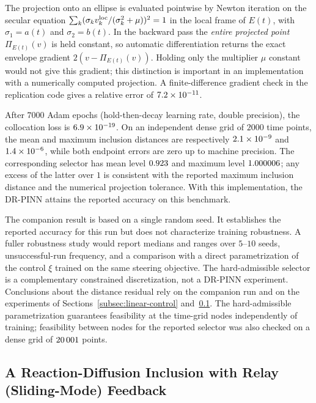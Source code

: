 \documentclass[11pt]{elsarticle}
\theoremstyle{definition}
\theoremstyle{remark}
\numberwithin{equation}{section}
\begin{document}
The projection onto an ellipse is evaluated pointwise by Newton iteration on
the secular equation
$\sum_k(\sigma_k v_k^{\rm loc}/(\sigma_k^2+\mu))^2=1$ in the local frame of
$E(t)$, with $\sigma_1=a(t)$ and $\sigma_2=b(t)$. In the backward pass the
\emph{entire projected point} $\Pi_{E(t)}(v)$ is held constant, so automatic
differentiation returns the exact envelope gradient
$2(v-\Pi_{E(t)}(v))$. Holding only the multiplier $\mu$ constant would not
give this gradient; this distinction is important in an implementation with
a numerically computed projection. A finite-difference gradient check in the
replication code gives a relative error of $7.2\times 10^{-11}$.

After $7000$ Adam epochs (hold-then-decay learning rate, double precision),
the collocation loss is $6.9\times 10^{-19}$. On an independent dense grid of
$2000$ time points, the mean and maximum inclusion distances are respectively
$2.1\times 10^{-9}$ and $1.4\times 10^{-6}$, while both endpoint errors are zero
up to machine precision. The corresponding selector has mean level $0.923$
and maximum level $1.000006$; any excess of the latter over $1$ is
consistent with the reported maximum inclusion distance and the numerical
projection tolerance. With this implementation, the DR-PINN attains the reported accuracy on
this benchmark.

The companion result is based on a single random seed. It establishes the
reported accuracy for this run but does not characterize training
robustness. A fuller robustness study would report medians and ranges over
$5$--$10$ seeds, unsuccessful-run frequency, and a comparison with a direct
parametrization of the control $\xi$ trained on the same steering
objective.
The hard-admissible selector is a complementary constrained discretization,
not a DR-PINN experiment. Conclusions about the distance residual rely on
the companion run and on the experiments of
Sections~\ref{subsec:linear-control} and~\ref{subsec:parabolic-PDI}.
The hard-admissible parametrization guarantees feasibility at the time-grid
nodes independently of training; feasibility between nodes for the reported
selector was also checked on a dense grid of $20\,001$ points.

\subsection{A Reaction-Diffusion Inclusion with Relay (Sliding-Mode) Feedback}
\label{subsec:parabolic-PDI}
\end{document}
